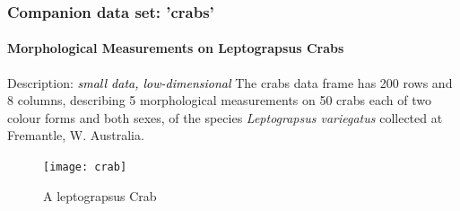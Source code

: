 \documentclass{beamer}\usepackage[]{graphicx}\usepackage[]{color}
\begin{document}
\begin{frame}[fragile]
  \frametitle{Companion data set: 'crabs'}
  \framesubtitle{Morphological Measurements on Leptograpsus Crabs}

\begin{block}{Description: \textcolor{black}{\it small data, low-dimensional}}
\small The crabs data frame has 200 rows and 8 columns, describing 5 morphological measurements on 50 crabs each of two colour forms and both sexes, of the species \textit{Leptograpsus variegatus} collected at Fremantle, W. Australia.\\
\end{block}

\begin{figure}
  \texttt{[image: crab]}
  \caption{A leptograpsus Crab}
\end{figure}
\end{frame}
\end{document}

